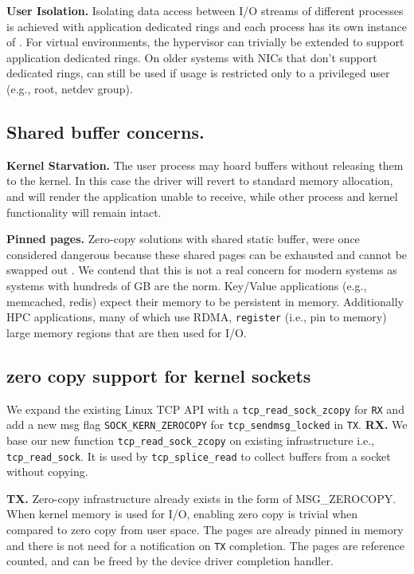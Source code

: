 \noindent\textbf{User Isolation.} Isolating data access between I/O streams of different processes is achieved with application dedicated rings and each process has its own instance of \oursys. For virtual environments, the hypervisor can trivially be extended to support application dedicated rings. On older systems with NICs that don't support dedicated rings, \oursys can still be used if usage is restricted only to a privileged user (e.g., root, netdev group).    

\subsection{Shared buffer concerns.}
\noindent\textbf{Kernel Starvation.} The user process may hoard \oursys buffers without releasing them to the kernel.
In this case the driver will revert to standard memory allocation, and will render the application unable to receive, while other process and kernel functionality will remain intact.


\noindent\textbf{Pinned pages.} Zero-copy solutions with shared static buffer, were once considered dangerous because these shared pages can be exhausted and cannot be swapped out \cite{song2012performance,yamagiwa2005active}. We contend that this is not a real concern for modern systems as systems with hundreds of GB are the norm. Key/Value applications (e.g., memcached, redis) expect their memory to be persistent in memory. Additionally HPC applications, many\cite{top500} of which use RDMA, \texttt{register} (i.e., pin to memory) large memory regions that are then used for I/O.

\subsection{zero copy support for kernel sockets}
We expand the existing Linux TCP API with a \texttt{tcp\_read\_sock\_zcopy} for \texttt{RX} and add a new msg flag \texttt{SOCK\_KERN\_ZEROCOPY} for \texttt{tcp\_sendmsg\_locked} in \texttt{TX}. 
\noindent \textbf{RX.} We base our new function \texttt{tcp\_read\_sock\_zcopy} on existing infrastructure i.e., \texttt{tcp\_read\_sock}. It is used by \texttt{tcp\_splice\_read} to collect buffers from a socket without copying.

\noindent \textbf{TX.} Zero-copy infrastructure already exists in the form of MSG\_ZEROCOPY\cite{desendmsg}. When kernel memory is used for I/O, enabling zero copy is trivial when compared to zero copy from user space. The pages are already pinned in memory and there is not need for a notification on \texttt{TX} completion. The pages are reference counted, and can be freed by the device driver completion handler.


